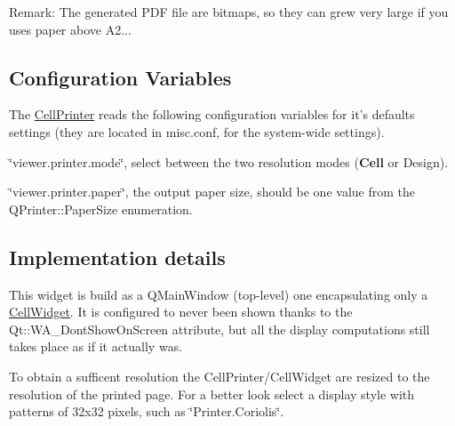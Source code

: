 \begin{DoxyParagraph}{Remark\-:}
The generated P\-D\-F file are bitmaps, so they can grew very large if you uses paper above A2...
\end{DoxyParagraph}
\hypertarget{classHurricane_1_1CellPrinter_secPrinterConfiguration}{}\subsection{Configuration Variables}\label{classHurricane_1_1CellPrinter_secPrinterConfiguration}
The \hyperlink{classHurricane_1_1CellPrinter}{Cell\-Printer} reads the following configuration variables for it's defaults settings (they are located in {\ttfamily misc.\-conf}, for the system-\/wide settings). 
\begin{DoxyItemize}
\item {\ttfamily \char`\"{}viewer.\-printer.\-mode\char`\"{}}, select between the two resolution modes ({\bf Cell} or Design). 
\item {\ttfamily \char`\"{}viewer.\-printer.\-paper\char`\"{}}, the output paper size, should be one value from the Q\-Printer\-::\-Paper\-Size enumeration. 
\end{DoxyItemize}\hypertarget{classHurricane_1_1CellPrinter_secPrinterImplDetails}{}\subsection{Implementation details}\label{classHurricane_1_1CellPrinter_secPrinterImplDetails}
This widget is build as a Q\-Main\-Window (top-\/level) one encapsulating only a \hyperlink{classHurricane_1_1CellWidget}{Cell\-Widget}. It is configured to never been shown thanks to the {\ttfamily Qt\-::\-W\-A\-\_\-\-Dont\-Show\-On\-Screen} attribute, but all the display computations still takes place as if it actually was.

To obtain a sufficent resolution the Cell\-Printer/\-Cell\-Widget are resized to the resolution of the printed page. For a better look select a display style with patterns of 32x32 pixels, such as {\ttfamily \char`\"{}\-Printer.\-Coriolis\char`\"{}}. 

